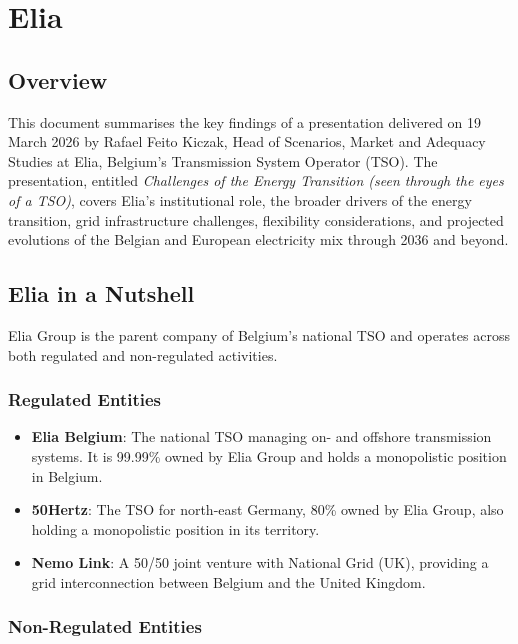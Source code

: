 \chapter{Elia}

\section{Overview}

This document summarises the key findings of a presentation delivered on 19 March 2026 by Rafael Feito Kiczak, Head of Scenarios, Market and Adequacy Studies at Elia, Belgium's Transmission System Operator (TSO). The presentation, entitled \textit{Challenges of the Energy Transition (seen through the eyes of a TSO)}, covers Elia's institutional role, the broader drivers of the energy transition, grid infrastructure challenges, flexibility considerations, and projected evolutions of the Belgian and European electricity mix through 2036 and beyond.

\section{Elia in a Nutshell}

Elia Group is the parent company of Belgium's national TSO and operates across both regulated and non-regulated activities.

\subsection{Regulated Entities}

\begin{itemize}[noitemsep]
    \item \textbf{Elia Belgium}: The national TSO managing on- and offshore transmission systems. It is 99.99\% owned by Elia Group and holds a monopolistic position in Belgium.
    \item \textbf{50Hertz}: The TSO for north-east Germany, 80\% owned by Elia Group, also holding a monopolistic position in its territory.
    \item \textbf{Nemo Link}: A 50/50 joint venture with National Grid (UK), providing a grid interconnection between Belgium and the United Kingdom.
\end{itemize}

\subsection{Non-Regulated Entities}

